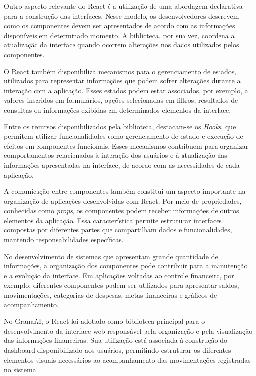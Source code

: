 Outro aspecto relevante do React é a utilização de uma abordagem declarativa para a construção das interfaces. Nesse modelo, os desenvolvedores descrevem como os componentes devem ser apresentados de acordo com as informações disponíveis em determinado momento. A biblioteca, por sua vez, coordena a atualização da interface quando ocorrem alterações nos dados utilizados pelos componentes.

O React também disponibiliza mecanismos para o gerenciamento de estados, utilizados para representar informações que podem sofrer alterações durante a interação com a aplicação. Esses estados podem estar associados, por exemplo, a valores inseridos em formulários, opções selecionadas em filtros, resultados de consultas ou informações exibidas em determinados elementos da interface.

Entre os recursos disponibilizados pela biblioteca, destacam-se os \textit{Hooks}, que permitem utilizar funcionalidades como gerenciamento de estado e execução de efeitos em componentes funcionais. Esses mecanismos contribuem para organizar comportamentos relacionados à interação dos usuários e à atualização das informações apresentadas na interface, de acordo com as necessidades de cada aplicação.

A comunicação entre componentes também constitui um aspecto importante na organização de aplicações desenvolvidas com React. Por meio de propriedades, conhecidas como \textit{props}, os componentes podem receber informações de outros elementos da aplicação. Essa característica permite estruturar interfaces compostas por diferentes partes que compartilham dados e funcionalidades, mantendo responsabilidades específicas.

No desenvolvimento de sistemas que apresentam grande quantidade de informações, a organização dos componentes pode contribuir para a manutenção e a evolução da interface. Em aplicações voltadas ao controle financeiro, por exemplo, diferentes componentes podem ser utilizados para apresentar saldos, movimentações, categorias de despesas, metas financeiras e gráficos de acompanhamento.

No GranaAI, o React foi adotado como biblioteca principal para o desenvolvimento da interface web responsável pela organização e pela visualização das informações financeiras. Sua utilização está associada à construção do dashboard disponibilizado aos usuários, permitindo estruturar os diferentes elementos visuais necessários ao acompanhamento das movimentações registradas no sistema.

